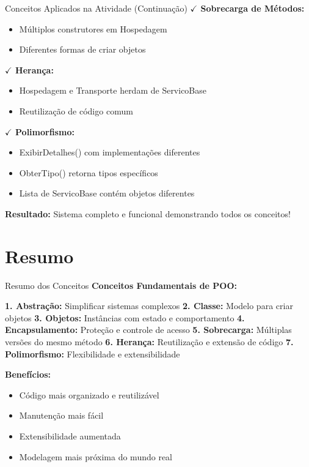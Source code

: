 \documentclass[aspectratio=169]{beamer}
\begin{document}
\begin{frame}{Conceitos Aplicados na Atividade (Continuação)}
\textbf{$\checkmark$ Sobrecarga de Métodos:}
\begin{itemize}
    \item Múltiplos construtores em Hospedagem
    \item Diferentes formas de criar objetos
\end{itemize}

\textbf{$\checkmark$ Herança:}
\begin{itemize}
    \item Hospedagem e Transporte herdam de ServicoBase
    \item Reutilização de código comum
\end{itemize}

\textbf{$\checkmark$ Polimorfismo:}
\begin{itemize}
    \item ExibirDetalhes() com implementações diferentes
    \item ObterTipo() retorna tipos específicos
    \item Lista de ServicoBase contém objetos diferentes
\end{itemize}

\textbf{Resultado:} Sistema completo e funcional demonstrando todos os conceitos!
\end{frame}

\section{Resumo}

\begin{frame}{Resumo dos Conceitos}
\textbf{Conceitos Fundamentais de POO:}

\textbf{1. Abstração:} Simplificar sistemas complexos
\textbf{2. Classe:} Modelo para criar objetos
\textbf{3. Objetos:} Instâncias com estado e comportamento
\textbf{4. Encapsulamento:} Proteção e controle de acesso
\textbf{5. Sobrecarga:} Múltiplas versões do mesmo método
\textbf{6. Herança:} Reutilização e extensão de código
\textbf{7. Polimorfismo:} Flexibilidade e extensibilidade

\textbf{Benefícios:}
\begin{itemize}
    \item Código mais organizado e reutilizável
    \item Manutenção mais fácil
    \item Extensibilidade aumentada
    \item Modelagem mais próxima do mundo real
\end{itemize}
\end{frame}
\end{document}
